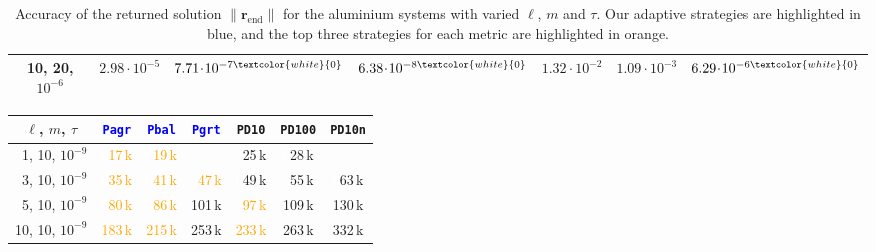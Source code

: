 \documentclass[hidelinks,onefignum,onetabnum]{siamart250211}
\newcommand{\rend}{\bm r_\text{end}}
\newcommand{\sPbal}{\texttt{Pbal}\xspace}
\newcommand{\sPagr}{\texttt{Pagr}\xspace}
\newcommand{\sPgrt}{\texttt{Pgrt}\xspace}
\newcommand{\sPdten}{\texttt{PD10}\xspace}
\newcommand{\sPdhun}{\texttt{PD100}\xspace}
\newcommand{\sPdnorm}{\texttt{PD10n}\xspace}
\begin{document}
\begin{table}[H]
\begin{tabular}{c|ccc|ccc}
        10, 20, $10^{-6}$                    & $2.98 \!\cdot\! 10^{-5}$        & \textcolor{orange}{$7.71 \!\cdot\! 10^{-7\textcolor{white}{0}}$} & \textcolor{orange}{$6.38 \!\cdot\! 10^{-8\textcolor{white}{0}}$} & $1.32 \!\cdot\! 10^{-2}$ & $1.09 \!\cdot\! 10^{-3}$ & \textcolor{orange}{$6.29 \!\cdot\! 10^{-6\textcolor{white}{0}}$} \\
        \bottomrule
    \end{tabular}
    \caption{Accuracy of the returned solution
    $\|\rend\|$ for the aluminium systems with varied $\ell$, $m$ and $\tau$.
    Our adaptive strategies are highlighted in blue, 
  and the top three strategies for each metric are
  highlighted in orange.}
    \label{tab:summary_Al_res}
\end{table}
\begin{table}[H]
  \centering
  \begin{tabular}{c|ccc|ccc}
      \toprule
      $\ell$, $m$, $\tau$                  & \textcolor{blue}{\sPagr}                 & \textcolor{blue}{\sPbal}                & \textcolor{blue}{\sPgrt}                 & \sPdten                                   & \sPdhun               & \sPdnorm            \\
      \midrule
      \textcolor{white}{0}1, 10, $10^{-9}$ & \textcolor{white}{0}\textcolor{orange}{17\,k} & \textcolor{white}{0}\textcolor{orange}{19\,k} &  & \textcolor{white}{0}25\,k                     & \textcolor{white}{0}28\,k  &  \\
      \textcolor{white}{0}3, 10, $10^{-9}$ & \textcolor{white}{0}\textcolor{orange}{35\,k} & \textcolor{white}{0}\textcolor{orange}{41\,k} & \textcolor{white}{0}\textcolor{orange}{47\,k} & \textcolor{white}{0}49\,k                     & \textcolor{white}{0}55\,k  & \textcolor{white}{0}63\,k \\
      \textcolor{white}{0}5, 10, $10^{-9}$ & \textcolor{white}{0}\textcolor{orange}{80\,k} & \textcolor{white}{0}\textcolor{orange}{86\,k} & 101\,k                                        & \textcolor{white}{0}\textcolor{orange}{97\,k}                     & 109\,k                     & 130\,k                    \\
      \midrule
      10, 10, $10^{-9}$                    & \textcolor{orange}{183\,k}                    & \textcolor{orange}{215\,k}                    & 253\,k                                        & \textcolor{orange}{233\,k}                    & 263\,k                     & 332\,k                    \\

\end{tabular}
\end{table}
\end{document}
